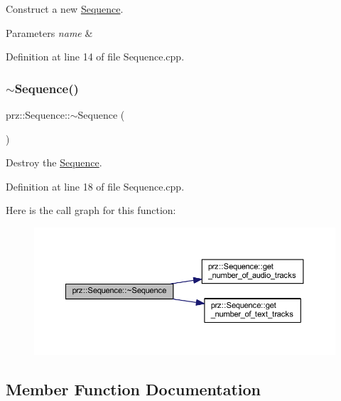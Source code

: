Construct a new \mbox{\hyperlink{classprz_1_1_sequence}{Sequence}}. 


\begin{DoxyParams}{Parameters}
{\em name} & \\
\hline
\end{DoxyParams}


Definition at line 14 of file Sequence.\+cpp.

\mbox{\label{classprz_1_1_sequence_aee7da60c0b19a1565ee44265a6738c43}} 
\subsubsection{\texorpdfstring{$\sim$Sequence()}{~Sequence()}}
{\footnotesize\ttfamily prz\+::\+Sequence\+::$\sim$\+Sequence (\begin{DoxyParamCaption}{ }\end{DoxyParamCaption})}



Destroy the \mbox{\hyperlink{classprz_1_1_sequence}{Sequence}}. 



Definition at line 18 of file Sequence.\+cpp.

Here is the call graph for this function\+:
\nopagebreak
\begin{figure}[H]
\begin{center}
\leavevmode
\includegraphics[width=350pt]{classprz_1_1_sequence_aee7da60c0b19a1565ee44265a6738c43_cgraph}
\end{center}
\end{figure}


\subsection{Member Function Documentation}
\mbox{\label{classprz_1_1_sequence_a67a5cf8454902f91c6168516a3a04a75}} 
